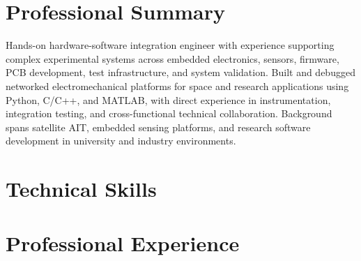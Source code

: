 \documentclass[letterpaper,11pt]{moderncv}
\begin{document}
\makecvtitle
\vspace{-3em}

\section{Professional Summary}
Hands-on hardware-software integration engineer with experience supporting complex experimental systems across embedded electronics, sensors, firmware, PCB development, test infrastructure, and system validation. Built and debugged networked electromechanical platforms for space and research applications using Python, C/C++, and MATLAB, with direct experience in instrumentation, integration testing, and cross-functional technical collaboration. Background spans satellite AIT, embedded sensing platforms, and research software development in university and industry environments.

\section{Technical Skills}
\begin{minipage}[t]{0.48\textwidth}
\end{minipage}%
\hfill
\begin{minipage}[t]{0.48\textwidth}
\end{minipage}

\section{Professional Experience}
\end{document}
